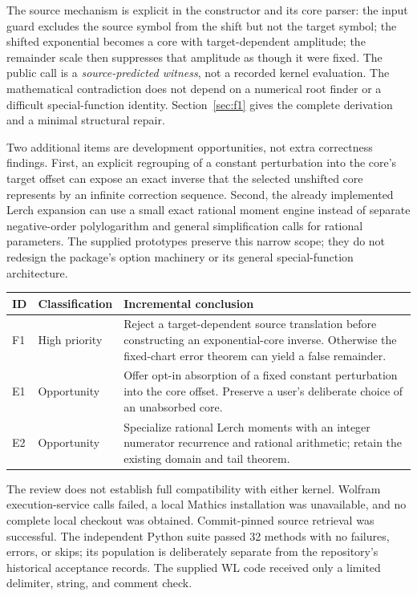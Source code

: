 \documentclass[11pt,letterpaper]{article}
\begin{document}
The source mechanism is explicit in the constructor and its core parser: the input guard excludes the source symbol from the shift but not the target symbol; the shifted exponential becomes a core with target-dependent amplitude; the remainder scale then suppresses that amplitude as though it were fixed. The public call is a \emph{source-predicted witness}, not a recorded kernel evaluation. The mathematical contradiction does not depend on a numerical root finder or a difficult special-function identity. Section~\ref{sec:f1} gives the complete derivation and a minimal structural repair.\cite{exp-core,lambert}

Two additional items are development opportunities, not extra correctness findings. First, an explicit regrouping of a constant perturbation into the core's target offset can expose an exact inverse that the selected unshifted core represents by an infinite correction sequence. Second, the already implemented Lerch expansion can use a small exact rational moment engine instead of separate negative-order polylogarithm and general simplification calls for rational parameters. The supplied prototypes preserve this narrow scope; they do not redesign the package's option machinery or its general special-function architecture.

\begin{tabularx}{\textwidth}{@{}p{.45in}p{1.0in}X@{}}
\toprule
ID & Classification & Incremental conclusion\\
\midrule
F1 & High priority & Reject a target-dependent source translation before constructing an exponential-core inverse. Otherwise the fixed-chart error theorem can yield a false remainder.\\[3pt]
E1 & Opportunity & Offer opt-in absorption of a fixed constant perturbation into the core offset. Preserve a user's deliberate choice of an unabsorbed core.\\[3pt]
E2 & Opportunity & Specialize rational Lerch moments with an integer numerator recurrence and rational arithmetic; retain the existing domain and tail theorem.\\
\bottomrule
\end{tabularx}

The review does not establish full compatibility with either kernel. Wolfram execution-service calls failed, a local Mathics installation was unavailable, and no complete local checkout was obtained. Commit-pinned source retrieval was successful. The independent Python suite passed 32 methods with no failures, errors, or skips; its population is deliberately separate from the repository's historical acceptance records. The supplied WL code received only a limited delimiter, string, and comment check.
\end{document}
